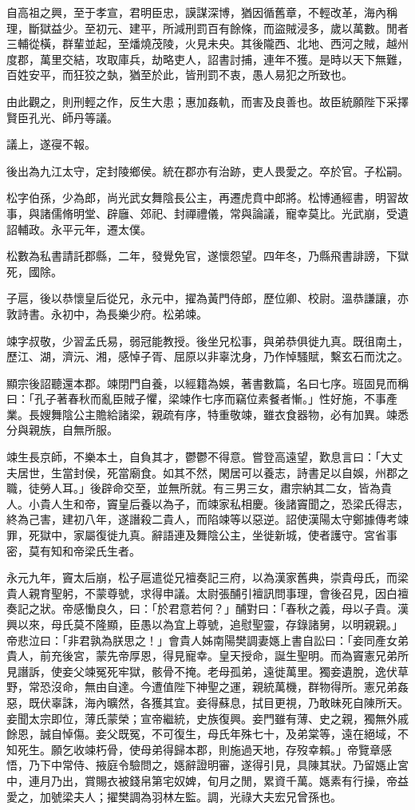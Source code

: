 \begin{pinyinscope}
自高祖之興，至于孝宣，君明臣忠，謨謀深博，猶因循舊章，不輕改革，海內稱理，斷獄益少。至初元、建平，所減刑罰百有餘條，而盜賊浸多，歲以萬數。閒者三輔從橫，群輩並起，至燔燒茂陵，火見未央。其後隴西、北地、西河之賊，越州度郡，萬里交結，攻取庫兵，劫略吏人，詔書討捕，連年不獲。是時以天下無難，百姓安平，而狂狡之埶，猶至於此，皆刑罰不衷，愚人易犯之所致也。

由此觀之，則刑輕之作，反生大患；惠加姦軌，而害及良善也。故臣統願陛下采擇賢臣孔光、師丹等議。

議上，遂寑不報。

後出為九江太守，定封陵鄉侯。統在郡亦有治跡，吏人畏愛之。卒於官。子松嗣。

松字伯孫，少為郎，尚光武女舞陰長公主，再遷虎賁中郎將。松博通經書，明習故事，與諸儒脩明堂、辟廱、郊祀、封禪禮儀，常與論議，寵幸莫比。光武崩，受遺詔輔政。永平元年，遷太僕。

松數為私書請託郡縣，二年，發覺免官，遂懷怨望。四年冬，乃縣飛書誹謗，下獄死，國除。

子扈，後以恭懷皇后從兄，永元中，擢為黃門侍郎，歷位卿、校尉。溫恭謙讓，亦敦詩書。永初中，為長樂少府。松弟竦。

竦字叔敬，少習孟氏易，弱冠能教授。後坐兄松事，與弟恭俱徙九真。既徂南土，歷江、湖，濟沅、湘，感悼子胥、屈原以非辜沈身，乃作悼騷賦，繫玄石而沈之。

顯宗後詔聽還本郡。竦閉門自養，以經籍為娛，著書數篇，名曰七序。班固見而稱曰：「孔子著春秋而亂臣賊子懼，梁竦作七序而竊位素餐者慚。」性好施，不事產業。長嫂舞陰公主贍給諸梁，親疏有序，特重敬竦，雖衣食器物，必有加異。竦悉分與親族，自無所服。

竦生長京師，不樂本土，自負其才，鬱鬱不得意。嘗登高遠望，歎息言曰：「大丈夫居世，生當封侯，死當廟食。如其不然，閑居可以養志，詩書足以自娛，州郡之職，徒勞人耳。」後辟命交至，並無所就。有三男三女，肅宗納其二女，皆為貴人。小貴人生和帝，竇皇后養以為子，而竦家私相慶。後諸竇聞之，恐梁氏得志，終為己害，建初八年，遂譖殺二貴人，而陷竦等以惡逆。詔使漢陽太守鄭據傳考竦罪，死獄中，家屬復徙九真。辭語連及舞陰公主，坐徙新城，使者護守。宮省事密，莫有知和帝梁氏生者。

永元九年，竇太后崩，松子扈遣從兄襢奏記三府，以為漢家舊典，崇貴母氏，而梁貴人親育聖躬，不蒙尊號，求得申議。太尉張酺引襢訊問事理，會後召見，因白襢奏記之狀。帝感慟良久，曰：「於君意若何？」酺對曰：「春秋之義，母以子貴。漢興以來，母氏莫不隆顯，臣愚以為宜上尊號，追慰聖靈，存錄諸舅，以明親親。」帝悲泣曰：「非君孰為朕思之！」會貴人姊南陽樊調妻嫕上書自訟曰：「妾同產女弟貴人，前充後宮，蒙先帝厚恩，得見寵幸。皇天授命，誕生聖明。而為竇憲兄弟所見譖訴，使妾父竦冤死牢獄，骸骨不掩。老母孤弟，遠徙萬里。獨妾遺脫，逸伏草野，常恐沒命，無由自達。今遭值陛下神聖之運，親統萬機，群物得所。憲兄弟姦惡，既伏辜誅，海內曠然，各獲其宜。妾得蘇息，拭目更視，乃敢昧死自陳所天。妾聞太宗即位，薄氏蒙榮；宣帝繼統，史族復興。妾門雖有薄、史之親，獨無外戚餘恩，誠自悼傷。妾父既冤，不可復生，母氏年殊七十，及弟棠等，遠在絕域，不知死生。願乞收竦朽骨，使母弟得歸本郡，則施過天地，存歿幸賴。」帝覽章感悟，乃下中常侍、掖庭令驗問之，嫕辭證明審，遂得引見，具陳其狀。乃留嫕止宮中，連月乃出，賞賜衣被錢帛第宅奴婢，旬月之閒，累資千萬。嫕素有行操，帝益愛之，加號梁夫人；擢樊調為羽林左監。調，光祿大夫宏兄曾孫也。


\end{pinyinscope}
